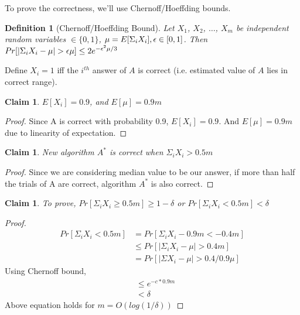 \documentclass[11pt]{article}
\newtheorem{definition}[theorem]{Definition}
\newtheorem{claim}[theorem]{Claim}
\def\eps{\ensuremath\epsilon}
\begin{document}
To prove the correctness, we'll use Chernoff/Hoeffding bounds.

\begin{definition}
[Chernoff/Hoeffding Bound]
Let $X_{1}$, $X_{2}$, $\ldots$, $X_{m}$ be independent random variables $\in \{0,1\}$,
$\mu = E[\Sigma_{i} X_{i}], \eps \in [0,1]$.
Then $Pr[|\Sigma_{i} X_{i}-\mu| > \eps\mu] \leq 2e^{-\eps^{2}\mu/3}$
\end{definition}

Define $X_{i} = 1$ iff the $i^{th}$ answer of $A$ is correct (i.e. estimated value of $A$ lies in correct range).

\begin{claim}
$E[X_{i}] = 0.9$, and $E[\mu] = 0.9m$
\end{claim}

\begin{proof}
Since A is correct with probability 0.9, $E[X_{i}] = 0.9$. And $E[\mu] = 0.9m$ due to linearity of expectation.
\end{proof}

\begin{claim}
New algorithm $A^{\ast}$ is correct when $\Sigma_{i} X_{i} > 0.5m$
\end{claim}

\begin{proof}
Since we are considering median value to be our answer, if more than half the trials of A are correct, algorithm $A^{\ast}$ is also correct.
\end{proof}

\begin{claim}
To prove, $Pr[\Sigma_{i} X_{i} \ge 0.5m] \ge 1-\delta$ or $Pr[\Sigma_{i} X_{i} < 0.5m] < \delta$
\end{claim}

\begin{proof}
\begin{equation}
\begin{split}
Pr[\Sigma_{i} X_{i} < 0.5m] & = Pr[\Sigma_{i} X_{i} - 0.9m < -0.4m]\\
& \le Pr[|\Sigma_{i} X_{i} - \mu| > 0.4m]\\
& = Pr[|\Sigma X_{i} - \mu| > 0.4/0.9 \mu]
\end{split}
\end{equation}
Using Chernoff bound,
\begin{equation}
\begin{split}
& \leq e^{-c*0.9m}\\
& < \delta
\end{split}
\end{equation}
Above equation holds for $m = O(log(1/\delta))$
\end{proof}
\end{document}
